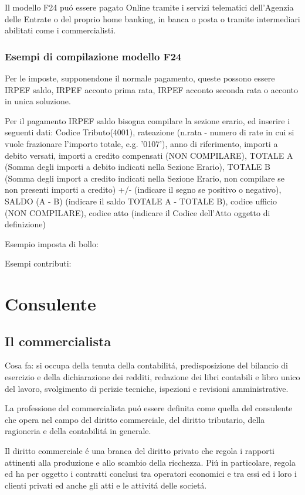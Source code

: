 \documentclass{article}
\begin{document}
Il modello F24 pu\'o essere pagato Online tramite i servizi telematici dell'Agenzia delle Entrate o del proprio home banking, in banca o posta o tramite intermediari abilitati come i commercialisti.


\subsubsection{Esempi di compilazione modello F24}
Per le imposte, supponendone il normale pagamento,
queste possono essere IRPEF saldo, IRPEF acconto prima rata, IRPEF acconto seconda rata o acconto in unica soluzione.

Per il pagamento IRPEF saldo bisogna compilare la sezione erario, ed inserire i seguenti dati: 
Codice Tributo(4001), 
rateazione (n.rata - numero di rate in cui si vuole frazionare l'importo totale, e.g. '0107'), 
anno di riferimento, 
importi a debito versati, 
importi a credito compensati (NON COMPILARE),
TOTALE A (Somma degli importi a debito indicati nella Sezione Erario),
TOTALE B (Somma degli import a credito indicati nella Sezione Erario, non compilare se non presenti importi a credito)
+/- (indicare il segno se positivo o negativo),
SALDO (A - B) (indicare il saldo TOTALE A - TOTALE B),
codice ufficio (NON COMPILARE),
codice atto (indicare il Codice dell'Atto oggetto di definizione)

Esempio imposta di bollo:

Esempi contributi:


\section{Consulente}
\subsection{Il commercialista}
Cosa fa: si occupa della tenuta della contabilit\'a, 
predisposizione del bilancio di esercizio e della dichiarazione dei redditi, 
redazione dei libri contabili e libro unico del lavoro, 
svolgimento di perizie tecniche, ispezioni e revisioni amministrative.

La professione del commercialista pu\'o essere definita come quella del consulente che opera 
nel campo del diritto commerciale, del diritto tributario, della ragioneria e della contabilit\'a in generale.

Il diritto commerciale \'e una branca del diritto privato che regola i rapporti attinenti alla produzione e allo scambio della ricchezza. Pi\'u in particolare, regola ed ha per oggetto i contratti conclusi tra operatori economici e tra essi ed i loro i clienti privati ed anche gli atti e le attivit\'a delle societ\'a. 
\end{document}

